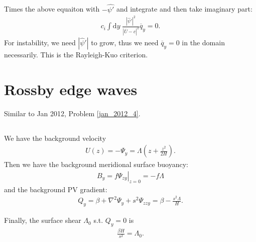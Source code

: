 \documentclass[11pt,letterpaper]{book}
\theoremstyle{definition}
\newcommand{\de}{\mathrm{d}}
\begin{document}
\subsection{}
Times the above equaiton with $-\hat{\psi'}$ and integrate and then take imaginary part:
\begin{align*}
    c_i\int \de y\;\frac{|\hat{\psi}'|^2}{|\overline{U}-c|^2}\overline{q}_y = 0.
\end{align*}
For instability, we need $|\hat{\psi}'|$ to grow, thus we need $\overline{q}_y = 0$ in the domain necessarily. This is the Rayleigh-Kuo criterion.

\section{Rossby edge waves}\label{jan_2015_3}
Similar to Jan 2012, Problem \ref{jan_2012_4}. 
\subsection{}
We have the background velocity
\begin{align*}
U(z) = -\Psi_y = \Lambda \left( z+\frac{z^2}{2H} \right).
\end{align*}
Then we have the background meridional surface buoyancy:
\begin{align*}
B_y = f\left.\Psi_{zy}\right|_{z=0} = -f\Lambda
\end{align*} 
and the background PV gradient:
\begin{align*}
Q_y = \beta+\nabla^2\Psi_y+s^2\Psi_{zzy} = \beta-\frac{s^2\Lambda}{H}.
\end{align*}

Finally, the surface shear $\Lambda_0$ s.t. $Q_y = 0$ is
\begin{align*}
\frac{\beta H}{s^2}=\Lambda_0.
\end{align*}
\end{document}
